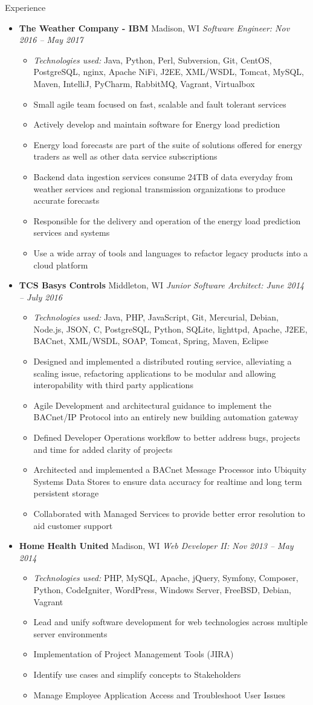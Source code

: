 \documentclass[11pt,oneside]{article}
\newenvironment{ressection}[1]{
    \vspace{4pt}
    {\fontfamily{phv}\selectfont\Large#1}
    \begin{itemize}
    \vspace{3pt}
}{
    \end{itemize}
}
\newcommand{\ressubitem}[1]{
    \vspace{-1pt}
    \item \begin{flushleft} #1 \end{flushleft}
}
\newcommand{\resbigitem}[3]{
    \vspace{-5pt}
    \item
    \textbf{#1} #2 \textit{#3}
}
\newenvironment{ressubsec}[3]{
    \resbigitem{#1}{#2}{#3}
    \vspace{-2pt}
    \begin{itemize}
}{
    \end{itemize}
}
\begin{document}
\begin{ressection}{Experience}
    \begin{ressubsec}{The Weather Company - IBM}{Madison, WI}{Software Engineer: Nov 2016 -- May 2017}
        \ressubitem{\textit{Technologies used:} Java, Python, Perl, Subversion, Git, CentOS, PostgreSQL, nginx, Apache NiFi, J2EE, XML/WSDL, Tomcat, MySQL, Maven, IntelliJ, PyCharm, RabbitMQ, Vagrant, Virtualbox }
        \ressubitem{Small agile team focused on fast, scalable and fault tolerant services}
        \ressubitem{Actively develop and maintain software for Energy load prediction}
        \ressubitem{Energy load forecasts are part of the suite of solutions offered for energy traders as well as other data service subscriptions}
        \ressubitem{Backend data ingestion services consume 24TB of data everyday from weather services and regional transmission organizations to produce accurate forecasts}
        \ressubitem{Responsible for the delivery and operation of the energy load prediction services and systems}
        \ressubitem{Use a wide array of tools and languages to refactor legacy products into a cloud platform}
    \end{ressubsec}
    \pagebreak
    \begin{ressubsec}{TCS Basys Controls}{Middleton, WI}{Junior Software Architect: June 2014 -- July 2016}
        \ressubitem{\textit{Technologies used:} Java, PHP, JavaScript, Git, Mercurial, Debian, Node.js, JSON, C, PostgreSQL, Python, SQLite, lighttpd, Apache, J2EE, BACnet, XML/WSDL, SOAP, Tomcat, Spring, Maven, Eclipse}
        \ressubitem{Designed and implemented a distributed routing service, alleviating a scaling issue, refactoring applications to be modular and allowing interopability with third party applications}
        \ressubitem{Agile Development and architectural guidance to implement the BACnet/IP Protocol into an entirely new building automation gateway}
        \ressubitem{Defined Developer Operations workflow to better address bugs, projects and time for added clarity of projects}
        \ressubitem{Architected and implemented a BACnet Message Processor into Ubiquity Systems Data Stores to ensure data accuracy for realtime and long term persistent storage}
        \ressubitem{Collaborated with Managed Services to provide better error resolution to aid customer support}
    \end{ressubsec}

    \begin{ressubsec}{Home Health United}{Madison, WI}{Web Developer II: Nov 2013 -- May 2014}
        \ressubitem{\textit{Technologies used:} PHP, MySQL, Apache, jQuery, Symfony, Composer, Python, CodeIgniter, WordPress, Windows Server, FreeBSD, Debian, Vagrant}
        \ressubitem{Lead and unify software development for web technologies across multiple server environments}
        \ressubitem{Implementation of Project Management Tools (JIRA)}
        \ressubitem{Identify use cases and simplify concepts to Stakeholders}
        \ressubitem{Manage Employee Application Access and Troubleshoot User Issues}
    \end{ressubsec}


\end{ressection}
\end{document}
